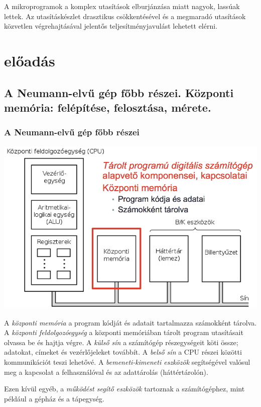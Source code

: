 \documentclass{article}
\begin{document}
A mikroprogramok a komplex utasítások elburjánzása miatt nagyok, lassúak lettek. Az utasításkészlet drasztikus csökkentésével és a megmaradó utasítások közvetlen végrehajtásával jelentős teljesítményjavulást lehetett elérni.

\section{előadás}

\subsection{A Neumann-elvű gép főbb részei. Központi memória: felépítése, felosztása, mérete.}

\subsubsection{A Neumann-elvű gép főbb részei}

\includegraphics[width=\textwidth]{neumann}

A \emph{központi memória} a program kódját és adatait tartalmazza számokként tárolva. A \emph{központi feldolgozóegység} a központi memóriában tárolt program utasításait olvassa be és hajtja végre. A \emph{külső sín} a számítógép részegységeit köti össze; adatokat, címeket és vezérlőjeleket továbbít. A \emph{belső sín} a CPU részei közötti kommunikációt teszi lehetővé. A \emph{bemeneti-kimeneti eszközök} segítségével valósul meg a kapcsolat a felhasználóval és az adattárolás (háttértárolón).

Ezen kívül egyéb, a \emph{működést segítő eszközök} tartoznak a számítógéphez, mint például a gépház és a tápegység.
\end{document}
